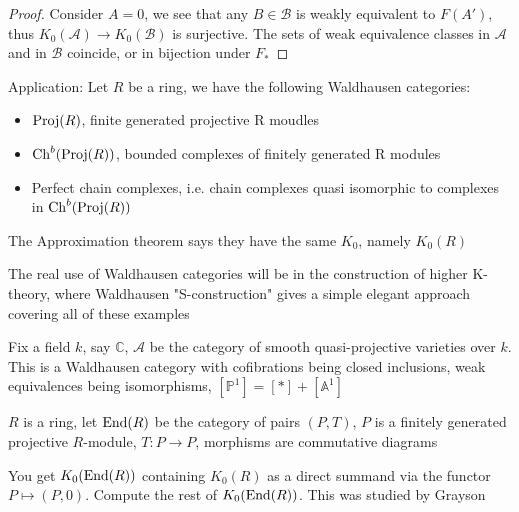 \documentclass[main]{subfiles}
\begin{document}
\begin{proof}
Consider $A=0$, we see that any $B\in\mathscr B$ is weakly equivalent to $F(A')$, thus $K_0(\mathscr A)\to K_0(\mathscr B)$ is surjective. The sets of weak equivalence classes in $\mathscr A$ and in $\mathscr B$ coincide, or in bijection under $F_*$
\end{proof}

Application: Let $R$ be a ring, we have the following Waldhausen categories:
\begin{itemize}
\item $\operatorname{Proj}(R)$, finite generated projective R moudles
\item $\operatorname{Ch}^b(\operatorname{Proj}(R))$, bounded complexes of finitely generated R modules
\item Perfect chain complexes, i.e. chain complexes quasi isomorphic to complexes in $\operatorname{Ch}^b(\operatorname{Proj}(R))$
\end{itemize}


The Approximation theorem says they have the same $K_0$, namely $K_0(R)$

The real use of Waldhausen categories will be in the construction of higher K-theory, where Waldhausen "S-construction" gives a simple elegant approach covering all of these examples

\begin{example}
Fix a field $k$, say $\mathbb C$, $\mathcal A$ be the category of smooth quasi-projective varieties over $k$. This is a Waldhausen category with cofibrations being closed inclusions, weak equivalences being isomorphisms, $[\mathbb P^1]=[*]+[\mathbb A^1]$
\end{example}

\begin{example}
$R$ is a ring, let $\operatorname{End}(R)$ be the category of pairs $(P,T)$, $P$ is a finitely generated projective $R$-module, $T:P\to P$, morphisms are commutative diagrams
\begin{center}
\end{center}
You get $K_0(\operatorname{End}(R))$ containing $K_0(R)$ as a direct summand via the functor $P\mapsto(P,0)$. Compute the rest of $K_0(\operatorname{End}(R))$. This was studied by Grayson
\end{example}

\fi
\end{document}
